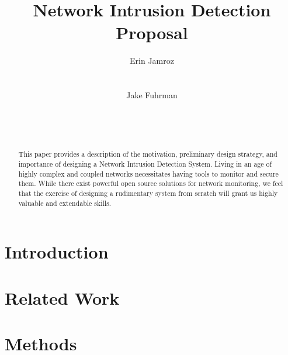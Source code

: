 \documentclass{acm_proc_article-sp}
\begin{document}
\title{Network Intrusion Detection Proposal}

\author{
\alignauthor
Erin Jamroz
       \\
       \\
       \\
\alignauthor
Jake Fuhrman
       \\
       \\
       \\
       \\       
}

\maketitle
\begin{abstract}
This paper provides a description of the motivation, preliminary design strategy, and importance of designing a Network Intrusion Detection System. Living in an age of highly complex and coupled networks necessitates having tools to monitor and secure them. While there exist powerful open source solutions for network monitoring, we feel that the exercise of designing a rudimentary system from scratch will grant us highly valuable and extendable skills.
\end{abstract}


\section{Introduction}

\section{Related Work}

\section{Methods}
\end{document}
